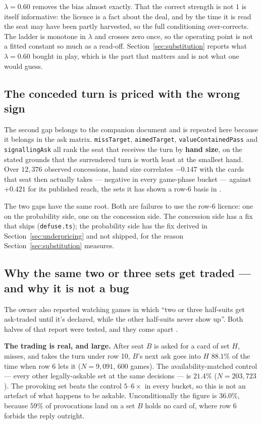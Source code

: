 \documentclass[11pt]{article}
\newcommand{\code}[1]{\texttt{#1}}
\begin{document}
$\lambda = 0.60$ removes the bias almost exactly. That the correct strength is not $1$ is
itself informative: the licence is a fact about the deal, and by the time it is read the
seat may have been partly harvested, so the full conditioning over-corrects. The ladder is
monotone in $\lambda$ and crosses zero once, so the operating point is not a fitted
constant so much as a read-off. Section~\ref{sec:substitution} reports what
$\lambda = 0.60$ bought in play, which is the part that matters and is not what one would
guess.

\subsection{The conceded turn is priced with the wrong sign}
\label{sec:wrongsign}

The second gap belongs to the companion document \cite{concession} and is repeated here
because it belongs in the ask matrix. \code{missTarget}, \code{aimedTarget},
\code{valueContainedPass} and \code{signallingAsk} all rank the seat that receives the
turn by \textbf{hand size}, on the stated grounds that the surrendered turn is worth least
at the smallest hand. Over $12{,}376$ observed concessions, hand size correlates
$\mathbf{-0.147}$ with the cards that seat then actually takes --- negative in every
game-phase bucket --- against $\mathbf{+0.421}$ for its published reach, the sets it has
shown a row-6 basis in \cite{concession}.

The two gaps have the same root. Both are failures to use the row-6 licence: one on the
probability side, one on the concession side. The concession side has a fix that ships
(\code{defuse.ts}); the probability side has the fix derived in
Section~\ref{sec:underpricing} and not shipped, for the reason
Section~\ref{sec:substitution} measures.

\subsection{Why the same two or three sets get traded --- and why it is not a bug}
\label{sec:clustering}

The owner also reported watching games in which ``two or three half-suits get ask-traded
until it's declared, while the other half-suits never show up''. Both halves of that
report were tested, and they come apart \cite{asking}.

\textbf{The trading is real, and large.} After seat $B$ is asked for a card of set $H$,
misses, and takes the turn under row 10, $B$'s next ask goes into $H$ $\mathbf{88.1\%}$ of
the time when row 6 lets it ($N = 9{,}091$, $600$ games). The availability-matched control
--- every other legally-askable set at the same decisions --- is $\mathbf{21.4\%}$
($N = 203{,}723$). The provoking set beats the control $5$--$6\times$ in every bucket, so
this is not an artefact of what happens to be askable. Unconditionally the figure is
$36.0\%$, because $59\%$ of provocations land on a set $B$ holds no card of, where row 6
forbids the reply outright.
\end{document}
